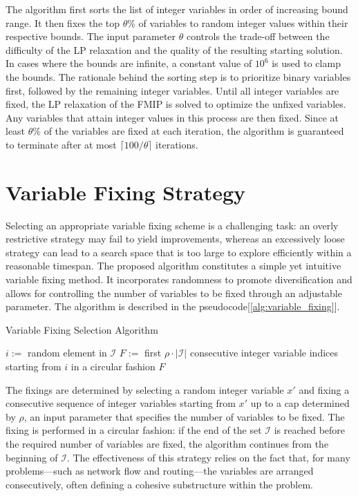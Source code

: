 The algorithm first sorts the list of integer variables in order of increasing bound range. It then fixes the top $\theta$\% of variables to random integer values within their respective bounds. The input parameter $\theta$ controls the trade-off between the difficulty of the LP relaxation and the quality of the resulting starting solution. In cases where the bounds are infinite, a constant value of $10^6$ is used to clamp the bounds.
The rationale behind the sorting step is to prioritize binary variables first, followed by the remaining integer variables.
Until all integer variables are fixed, the LP relaxation of the FMIP is solved to optimize the unfixed variables. Any variables that attain integer values in this process are then fixed.
Since at least $\theta$\% of the variables are fixed at each iteration, the algorithm is guaranteed to terminate after at most $\lceil 100 / \theta \rceil$ iterations.
\section{Variable Fixing Strategy}
Selecting an appropriate variable fixing scheme is a challenging task: an overly restrictive strategy may fail to yield improvements, whereas an excessively loose strategy can lead to a search space that is too large to explore efficiently within a reasonable timespan.
The proposed algorithm constitutes a simple yet intuitive variable fixing method. It incorporates randomness to promote diversification and allows for controlling the number of variables to be fixed through an adjustable parameter.
The algorithm is described in the  pseudocode[\ref{alg:variable_fixing}].
\begin{algorithm}
\caption{Variable Fixing Selection Algorithm}\label{alg:variable_fixing}
\begin{algorithmic}[1]
    \State $i :=$ random element in $\mathcal{I}$
    \State $F :=$ first $\rho \cdot |\mathcal{I}|$ consecutive integer variable indices starting from $i$ in a circular fashion
    \State \Return $F$
\EndFunction
\end{algorithmic}
\end{algorithm}
The fixings are determined by selecting a random integer variable $x'$ and fixing a consecutive sequence of integer variables starting from $x'$ up to a cap determined by $\rho$, an input parameter that specifies the number of variables to be fixed. The fixing is performed in a circular fashion: if the end of the set $\mathcal{I}$ is reached before the required number of variables are fixed, the algorithm continues from the beginning of $\mathcal{I}$.
The effectiveness of this strategy relies on the fact that, for many problems—such as network flow and routing—the variables are arranged consecutively, often defining a cohesive substructure within the problem.